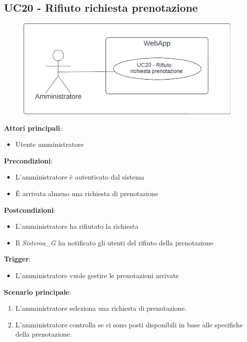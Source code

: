 \subsection{UC20 - Rifiuto richiesta prenotazione}\label{usecase:20}
\begin{figure}[H]
    \centering
    \includegraphics[width=0.9\linewidth]{ucd/ucd20.png}
\end{figure}
\textbf{Attori principali}:
\begin{itemize}
    \item Utente amministratore
\end{itemize}
\textbf{Precondizioni}:
\begin{itemize}
    \item L'amministratore è autenticato dal sistema
    \item \`E arrivata almeno una richiesta di prenotazione
\end{itemize}
\textbf{Postcondizioni}:
\begin{itemize}
    \item L'amministratore ha rifiutato la richiesta
    \item Il \textit{Sistema_G} ha notificato gli utenti del rifiuto della prenotazione
\end{itemize}
\textbf{Trigger}:
\begin{itemize}
    \item L'amministratore vuole gestire le prenotazioni arrivate
\end{itemize}
\textbf{Scenario principale}:
\begin{enumerate}
    \item L'amministratore seleziona una richiesta di prenotazione.
    \item L'amministratore controlla se ci sono posti disponibili in base alle specifiche della prenotazione.
\end{enumerate}
\newpage


